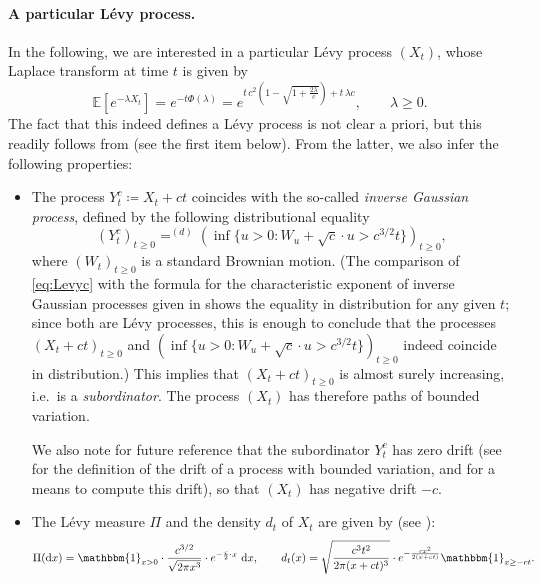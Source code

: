 \documentclass[10pt]{amsart}
\theoremstyle{definition}\newtheorem{defi}[theo]{Definition}\newtheorem{rema}[theo]{Remark}\newtheorem{exam}[theo]{Example}\newtheorem{exem}[theo]{Example}\newtheorem{nota}[theo]{Notation}
\def\d{{\rm d}}
\newcommand\Es[1]{\mathbb{E}\left[#1\right]}
\begin{document}
\paragraph*{A particular L\'evy process.} In the following, we are interested in a particular L\'evy process $(X_t)$,
whose Laplace transform at time $t$ is given by
\begin{equation}
  \Es{e^{-\lambda X_t}}=e ^{-t \Phi(\lambda)}=e^{t \, c^{2}   \left( 1- \sqrt{1+ \frac{2 \lambda}{c} } \right) +t\, \lambda c }, \qquad \lambda \geq 0.
    \label{eq:Levyc}
\end{equation}
The fact that this indeed defines a L\'evy process is not clear a priori, but this readily follows from  \cite[Sec.1.2.5]{Kyp06}
(see the first item below).
From the latter, we also infer the following properties:
\begin{itemize}
  \item The process $Y^c_t \coloneqq X_t +ct$ coincides with the so-called \emph{inverse Gaussian process},
    defined by the following distributional equality
    \[(Y^c_t)_{t \ge 0} \mathop{=}^{(d)} \left(  \inf \{u>0 : W_{u}+\sqrt{c} \cdot u > c^{3/2} t \}  \right) _{t \geq 0},\]
    where $(W_{t})_{t \geq 0}$ is a standard Brownian motion.
    (The comparison of \eqref{eq:Levyc} with the formula for the characteristic exponent
    of inverse Gaussian processes given in \cite[Sec.1.2.5]{Kyp06} shows the equality in distribution for any given $t$;
    since both are L\'evy processes, this is enough to conclude that the processes
    $(X_t +ct)_{t \ge 0}$ and $\left(  \inf \{u>0 : W_{u}+\sqrt{c} \cdot u > c^{3/2} t \}  \right) _{t \geq 0}$
    indeed coincide in distribution.)
    This implies that $(X_t +ct)_{t \geq 0}$ is almost surely increasing, i.e.\ is a {\em subordinator}.
    The process $(X_t)$ has therefore paths of bounded variation.

We also note for future reference that the subordinator $Y^{c}_t$ has zero drift
(see \cite[Eq.~(2.21)]{Kyp06} for the definition of the drift of a process with bounded variation,
and \cite[Exercise 2.11]{Kyp06} for a means to compute this drift),
so that $(X_t)$ has negative drift $-c$.
  \item The L\'evy measure $\Pi$ and the density $d_t$ of $X_t$ are given by (see \cite[Exercice 1.6]{Kyp06}):
  \begin{equation}
  \label{eq:densiteXt}
  \Pi({\d}x)= \mathbbm{1}_{x>0} \cdot \frac{c^{3/2}}{\sqrt{2 \pi x^{3}}} \cdot e^{- \frac{c }{2} \cdot x} \ \mathrm{d}x, \qquad   d_{t}(x) =  \sqrt{ \frac{c^3 t^2}{2 \pi (x+ct)^{3}}} \cdot e^{- \frac{c x^{2}}{2(x+ct)}}  \mathbbm{1}_{x \geq -ct}.
  \end{equation}


\end{itemize}
\end{document}

